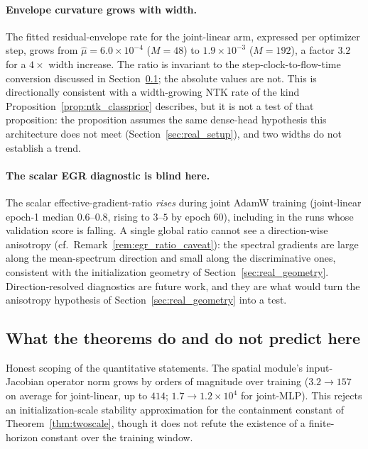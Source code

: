 \paragraph{Envelope curvature grows with width.}
The fitted residual-envelope rate for the joint-linear arm, expressed
per optimizer step, grows from $\hat\mu = 6.0 \times 10^{-4}$
($M{=}48$) to $1.9 \times 10^{-3}$ ($M{=}192$), a factor $3.2$ for a
$4\times$ width increase. The ratio is invariant to the
step-clock-to-flow-time conversion discussed in
Section~\ref{sec:real_scope}; the absolute values are not. This is
directionally consistent with a width-growing NTK rate of the kind
Proposition~\ref{prop:ntk_classprior} describes, but it is not a test
of that proposition: the proposition assumes the same dense-head
hypothesis this architecture does not meet
(Section~\ref{sec:real_setup}), and two widths do not establish a
trend.

\paragraph{The scalar EGR diagnostic is blind here.}
The scalar effective-gradient-ratio \emph{rises} during joint AdamW
training (joint-linear epoch-1 median $0.6$--$0.8$, rising to $3$--$5$
by epoch 60), including in the runs whose validation score is falling. A single
global ratio cannot see a direction-wise anisotropy (cf.\
Remark~\ref{rem:egr_ratio_caveat}): the spectral gradients are large
along the mean-spectrum direction and small along the discriminative
ones, consistent with the initialization geometry of
Section~\ref{sec:real_geometry}. Direction-resolved diagnostics are
future work, and they are what would turn the anisotropy hypothesis of
Section~\ref{sec:real_geometry} into a test.

\subsection{What the theorems do and do not predict here}
\label{sec:real_scope}

Honest scoping of the quantitative statements. The spatial module's
input-Jacobian operator norm grows by orders of magnitude over training
($3.2 \to 157$ on average for joint-linear, up to $414$;
$1.7 \to 1.2 \times 10^{4}$ for joint-MLP). This rejects an
initialization-scale stability approximation for the containment
constant of Theorem~\ref{thm:twoscale}, though it does not refute the
existence of a finite-horizon constant over the training window.


